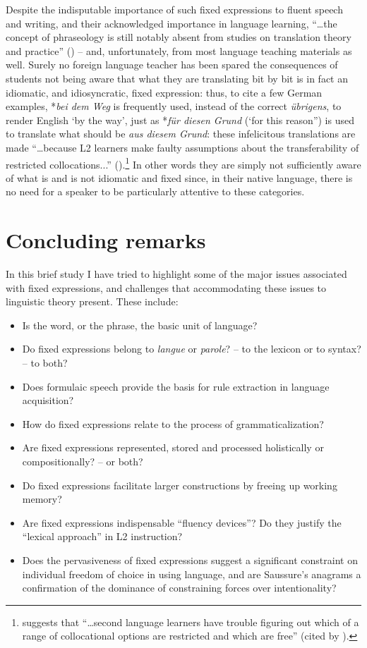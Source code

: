 \documentclass[english,output=paper,colorlinks,citecolor=brown]{../langscibook}
\begin{document}
Despite the indisputable importance of such fixed expressions to fluent speech and writing, and their acknowledged importance in language learning, “…the concept of phraseology is still notably absent from studies on translation theory and practice” (\citealt[xxiv]{GrangerMeunier2008}) – and, unfortunately, from most language teaching materials as well. Surely no foreign language teacher has been spared the consequences of students not being aware that what they are translating bit by bit is in fact an idiomatic, and idiosyncratic, fixed expression: thus, to cite a few German examples, *\textit{bei dem  Weg} is frequently used, instead of the correct \textit{übrigens}, to render English `by the way', just as *\textit{für diesen Grund} (‘for this reason'') is used to translate what should be \textit{aus diesem Grund}: these infelicitous translations are made “…because L2 learners make faulty assumptions about the transferability of restricted collocations...” (\citealt[833]{KimKim2012}).\footnote{\citet[34]{Howarth1998} suggests that “…second language learners have trouble figuring out which of a range of collocational options are restricted and which are free” (cited by \citealt[833]{KimKim2012}).} In other words they are simply not sufficiently aware of what is and is not idiomatic and fixed since, in their native language, there is no need for a speaker to be particularly attentive to these categories.

\section{Concluding remarks}
In this brief study I have tried to highlight some of the major issues associated with fixed expressions, and challenges that accommodating these issues to linguistic theory present. These include:

\begin{itemize}
\item Is the word, or the phrase, the basic unit of language?
\item Do fixed expressions belong to \textit{langue} or \textit{parole}? – to the lexicon or to syntax? – to both? 
\item Does formulaic speech provide the basis for rule extraction in language acquisition?
\item How do fixed expressions relate to the process of grammaticalization?
\item Are fixed expressions represented, stored and processed holistically or compositionally? – or both?
\item Do fixed expressions facilitate larger constructions by freeing up working memory?
\item Are fixed expressions indispensable ``fluency devices''? Do they justify the ``lexical approach'' in L2 instruction?
\item Does the pervasiveness of fixed expressions suggest a significant cons\-traint on individual freedom of choice in using language, and are Saussure’s anagrams a confirmation of the dominance of constraining forces over intentionality?
\end{itemize}
\end{document}
